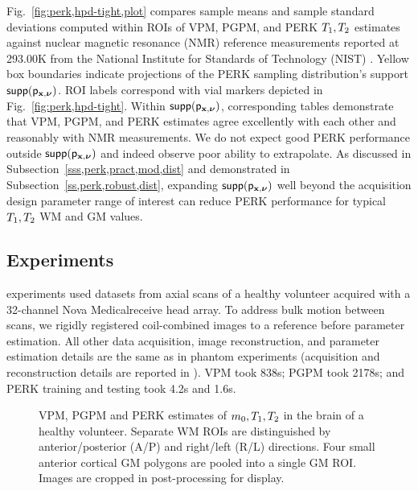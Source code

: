 Fig.~\ref{fig:perk,hpd-tight,plot} compares
sample means and sample standard deviations
computed within ROIs 
of VPM, PGPM, and PERK $T_1,T_2$ estimates
against nuclear magnetic resonance (NMR) reference measurements 
reported at 293.00K
from the National Institute 
for Standards of Technology (NIST) \cite{keenan:16:msm}.
Yellow box boundaries indicate projections
of the PERK sampling distribution's support $\supp{\dist{\bmx,\bmnu}}$.
ROI labels correspond with vial markers
depicted in Fig.~\ref{fig:perk,hpd-tight}.
Within $\supp{\dist{\bmx,\bmnu}}$,
corresponding tables demonstrate
that VPM, PGPM, and PERK estimates agree excellently 
with each other 
and reasonably with NMR measurements.
We do not expect good PERK performance
outside $\supp{\dist{\bmx,\bmnu}}$ 
and indeed observe 
poor ability to extrapolate.
As discussed in Subsection~\ref{sss,perk,pract,mod,dist}
and demonstrated in Subsection~\ref{ss,perk,robust,dist},
expanding $\supp{\dist{\bmx,\bmnu}}$
well beyond the acquisition design 
parameter range of interest
can reduce PERK performance
for typical $T_1,T_2$ WM and GM values.

\subsection{\Invivo Experiments}
\label{ss,perk,exp,invivo}

\Invivo experiments used datasets
from axial scans of a healthy volunteer
acquired with a 32-channel Nova Medical\regis receive head array.
To address bulk motion between scans,
we rigidly registered coil-combined images 
to a reference
before parameter estimation.
All other data acquisition, 
image reconstruction, 
and parameter estimation details
are the same as in phantom experiments
(acquisition and reconstruction details 
are reported in \cite{nataraj:17:oms}).
VPM took 838s;
PGPM took 2178s;
and PERK training and testing
took 4.2s and 1.6s.

\begin{figure*}[!ht]
	\centering
	\begin{minipage}{\textwidth}
  	\hspace{0cm}
  	\hspace{0cm}
	\end{minipage}
	\caption{%
		VPM, PGPM and PERK estimates
		of $m_0,T_1,T_2$ 
		in the brain of a healthy volunteer.
		Separate WM ROIs are distinguished
		by anterior/posterior (A/P)
		and right/left (R/L) directions.
		Four small anterior cortical GM polygons
		are pooled into a single GM ROI.
		Images are cropped in post-processing 
		for display.
	}
	\label{fig:perk,brain}
\end{figure*}

